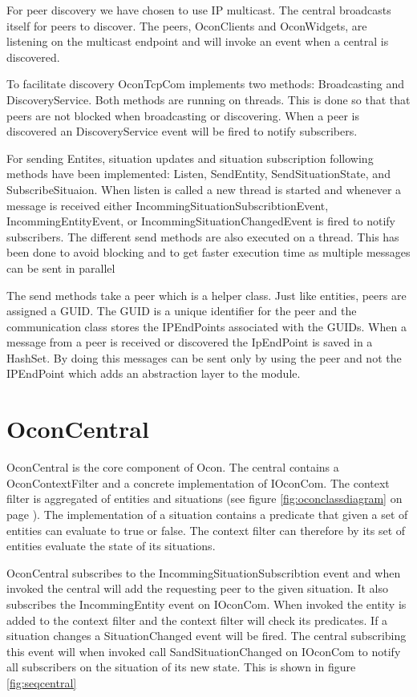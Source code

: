 \documentclass[../report.tex]{subfiles}
\begin{document}
For peer discovery we have chosen to use IP multicast. The central broadcasts itself for peers to discover. The peers, OconClients and OconWidgets, are listening on the multicast endpoint and will invoke an event when a central is discovered.

To facilitate discovery OconTcpCom implements two methods: Broadcasting and DiscoveryService. Both methods are running on threads. This is done so that that peers are not blocked when broadcasting or discovering. When a peer is discovered an DiscoveryService event will be fired to notify subscribers.

For sending Entites, situation updates and situation subscription following methods have been implemented: Listen, SendEntity, SendSituationState, and SubscribeSituaion. When listen is called a new thread is started and whenever a message is received either IncommingSituationSubscribtionEvent, IncommingEntityEvent, or IncommingSituationChangedEvent is fired to notify subscribers. The different send methods are also executed on a thread. This has been done to avoid blocking and to get faster execution time as multiple messages can be sent in parallel

The send methods take a peer which is a helper class. Just like entities, peers are assigned a GUID. The GUID is a unique identifier for the peer and the communication class stores the IPEndPoints associated with the GUIDs. When a message from a peer is received or discovered the IpEndPoint is saved in a HashSet. By doing this messages can be sent only by using the peer and not the IPEndPoint which adds an abstraction layer to the module. 

\section{OconCentral}
OconCentral is the core component of Ocon. The central contains a OconContextFilter and a concrete implementation of IOconCom. The context filter is aggregated of entities and situations (see figure \ref{fig:oconclassdiagram} on page \pageref{fig:oconclassdiagram}). The implementation of a situation contains a predicate that given a set of entities can evaluate to true or false. The context filter can therefore by its set of entities evaluate the state of its situations.

OconCentral subscribes to the IncommingSituationSubscribtion event and when invoked the central will add the requesting peer to the given situation. It also subscribes the IncommingEntity event on IOconCom. When invoked the entity is added to the context filter and the context filter will check its predicates. If a situation changes a SituationChanged event will be fired. The central subscribing this event will when invoked call SandSituationChanged on IOconCom to notify all subscribers on the situation of its new state. This is shown in figure \ref{fig:seqcentral}
\end{document}
